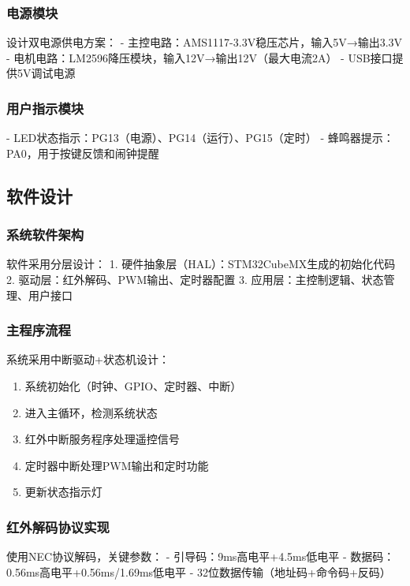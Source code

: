 \subsubsection{电源模块}
设计双电源供电方案：
- 主控电路：AMS1117-3.3V稳压芯片，输入5V→输出3.3V
- 电机电路：LM2596降压模块，输入12V→输出12V（最大电流2A）
- USB接口提供5V调试电源

\subsubsection{用户指示模块}
- LED状态指示：PG13（电源）、PG14（运行）、PG15（定时）
- 蜂鸣器提示：PA0，用于按键反馈和闹钟提醒

\subsection{软件设计}

\subsubsection{系统软件架构}
软件采用分层设计：
1. 硬件抽象层（HAL）：STM32CubeMX生成的初始化代码
2. 驱动层：红外解码、PWM输出、定时器配置
3. 应用层：主控制逻辑、状态管理、用户接口

\subsubsection{主程序流程}
系统采用中断驱动+状态机设计：
\begin{enumerate}
    \item 系统初始化（时钟、GPIO、定时器、中断）
    \item 进入主循环，检测系统状态
    \item 红外中断服务程序处理遥控信号
    \item 定时器中断处理PWM输出和定时功能
    \item 更新状态指示灯
\end{enumerate}

\subsubsection{红外解码协议实现}
使用NEC协议解码，关键参数：
- 引导码：9ms高电平+4.5ms低电平
- 数据码：0.56ms高电平+0.56ms/1.69ms低电平
- 32位数据传输（地址码+命令码+反码）

